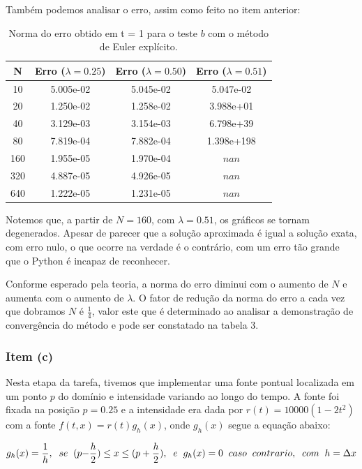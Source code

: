 \documentclass[a4paper, 12pt]{article}
\begin{document}
Também podemos analisar o erro, assim como feito no item anterior: 

\begin{table}[!h]
    \centering
    \begin{tabular}{|c|c|c|c|}
    \hline                               %
    N & Erro ($\lambda = 0.25$) & Erro ($\lambda = 0.50$) & Erro ($\lambda = 0.51$) \\
    \hline
    10  & 5.005e-02  & 5.045e-02 & 5.047e-02   \\
    20  & 1.250e-02  & 1.258e-02 & 3.988e+01   \\
    40  & 3.129e-03  & 3.154e-03 & 6.798e+39  \\
    80  & 7.819e-04  & 7.882e-04 & 1.398e+198 \\
    160 & 1.955e-05  & 1.970e-04 &  $nan$ \\
    320 & 4.887e-05  & 4.926e-05 &  $nan$ \\
    640 & 1.222e-05  & 1.231e-05 &  $nan$ \\
    \hline
    \end{tabular}
    \caption{Norma do erro obtido em t = 1 para o teste $b$ com o método de Euler explícito.}
\end{table}

Notemos que, a partir de $N=160$, com $\lambda=0.51$, os gráficos se tornam degenerados. Apesar de parecer que a solução aproximada é igual a solução exata, com erro nulo, o que ocorre na verdade é o contrário, com um erro tão grande que o Python é incapaz de reconhecer.

Conforme esperado pela teoria, a norma do erro diminui com o aumento de $N$ e aumenta com o aumento de $\lambda$. O fator de redução da norma do erro a cada vez que dobramos $N$ é $\frac{1}{4}$, valor este que é determinado ao analisar a demonstração de convergência do método e pode ser constatado na tabela 3. 

\subsubsection{Item (c)}
Nesta etapa da tarefa, tivemos que implementar uma fonte pontual localizada em um ponto $p$ do domínio e intensidade variando ao longo do tempo. A fonte foi fixada na posição $p=0.25$ e a intensidade era dada por $r(t) = 10000({1 - 2t^2})$ com a fonte $f(t, x) = r(t)g_{h}(x)$, onde $g_{h}(x)$ segue a equação abaixo:


\begin{eqnarray}
g_{h}(x) =\frac{1}{h}, \hspace{0.2cm} se \hspace{0.2cm} (p {-}\frac{h}{2}) \leq  x \leq (p + \frac{h}{2}),\hspace{0.2cm} e \hspace{0.2cm} g_{h}(x) = 0 \hspace{0.2cm} caso\hspace{0.2cm} contrario, \hspace{0.2cm} com \hspace{0.2cm} h = \Delta x
\label{eqn:ghx}
\end{eqnarray}
\end{document}
